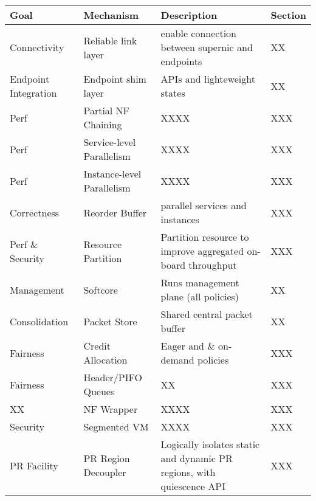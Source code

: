 
{
\begin{table*}[th]\footnotesize
\begin{center}
\begin{tabular}{ p{1in} | p{1.5in} |p{3.3in} | p{0.5in}}

\textbf{Goal} &
\textbf{Mechanism} &
\textbf{Description} &
\textbf{Section} \\
\hline
\hline

Connectivity            & Reliable link layer & enable connection between supernic and endpoints & XX \\
\hline
Endpoint Integration    & Endpoint shim layer & APIs and lighteweight states & XX \\
\hline
\hline

Perf & Partial NF Chaining & XXXX  & XXX \\
\hline

Perf & Service-level Parallelism & XXXX  & XXX \\
\hline

Perf & Instance-level Parallelism & XXXX  & XXX \\
\hline

Correctness & Reorder Buffer & parallel services and instances & XXX \\
\hline

Perf \& Security & Resource Partition & Partition resource to improve aggregated on-board throughput & XXX \\
\hline
\hline

Management & Softcore & Runs management plane (all policies) & XX \\
\hline

Consolidation & Packet Store & Shared central packet buffer & XX \\
\hline

Fairness & Credit Allocation & Eager and \& on-demand policies & XXX \\
\hline

Fairness & Header/PIFO Queues & XX & XXX \\
\hline

XX & NF Wrapper & XXXX & XXX \\
\hline

Security & Segmented VM & XXXX & XXX \\
\hline


PR Facility & PR Region Decoupler & Logically isolates static and dynamic PR regions, with quiescence API & XXX \\
\hline


\end{tabular}
\end{center}
\end{table*}}
